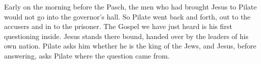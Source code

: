 \raggedcolumns

Early on the morning before the Pasch, the men who had brought Jesus to Pilate
would not go into the governor's hall. So Pilate went back and forth, out to
the accusers and in to the prisoner. The Gospel we have just heard is his
first questioning inside. Jesus stands there bound, handed over by the leaders
of his own nation. Pilate asks him whether he is the king of the Jews, and
Jesus, before answering, asks Pilate where the question came from.

